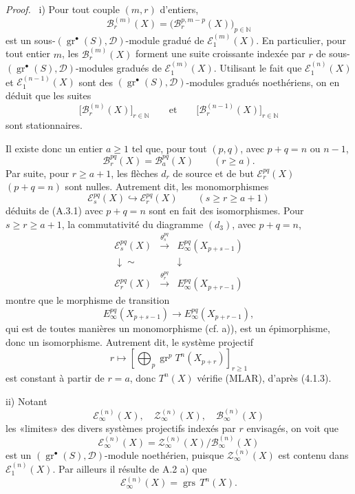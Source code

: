 \documentclass[11pt]{article}
\newenvironment{prooftext}[1][Proof]{\par\noindent\emph{#1.}\ }{\par\medskip}
\providecommand{\gr}{\operatorname{gr}}
\providecommand{\gr}{\operatorname{gr}}
\providecommand{\gr}{\operatorname{gr}}
\providecommand{\grs}{\operatorname{grs}}
\begin{document}
\begin{prooftext}
i) Pour tout couple \((m,r)\) d'entiers,
\[
\mathcal B_r^{(m)}(X)=\bigl(\mathcal B_r^{p,m-p}(X)\bigr)_{p\in\mathbb N}
\]
est un sous-\((\gr^\bullet(S),\mathcal D)\)-module gradué de \(\mathcal E_1^{(m)}(X)\). En particulier, pour tout entier \(m\), les \(\mathcal B_r^{(m)}(X)\) forment une suite croissante indexée par \(r\) de sous-\((\gr^\bullet(S),\mathcal D)\)-modules gradués de \(\mathcal E_1^{(m)}(X)\). Utilisant le fait que \(\mathcal E_1^{(n)}(X)\) et \(\mathcal E_1^{(n-1)}(X)\) sont des \((\gr^\bullet(S),\mathcal D)\)-modules gradués noethériens, on en déduit que les suites
\[
\bigl[\mathcal B_r^{(n)}(X)\bigr]_{r\in\mathbb N}
\qquad\text{et}\qquad
\bigl[\mathcal B_r^{(n-1)}(X)\bigr]_{r\in\mathbb N}
\]
sont stationnaires.

Il existe donc un entier \(a\ge1\) tel que, pour tout \((p,q)\), avec \(p+q=n\) ou \(n-1\),
\begin{equation}
\mathcal B_r^{pq}(X)=\mathcal B_a^{pq}(X)\qquad(r\ge a).
\tag{A.3.1}
\end{equation}
Par suite, pour \(r\ge a+1\), les flèches \(d_r\) de source et de but \(\mathcal E_r^{pq}(X)\) \((p+q=n)\) sont nulles. Autrement dit, les monomorphismes
\[
\mathcal E_s^{pq}(X)\hookrightarrow\mathcal E_r^{pq}(X)\qquad(s\ge r\ge a+1)
\]
déduits de (A.3.1) avec \(p+q=n\) sont en fait des isomorphismes. Pour \(s\ge r\ge a+1\), la commutativité du diagramme \((d_3)\), avec \(p+q=n\),
\[
\begin{array}{ccc}
\mathcal E_s^{pq}(X)&\xrightarrow{\theta_s^{pq}}&E_\infty^{pq}(X_{p+s-1})\\
\downarrow\sim&&\downarrow\\
\mathcal E_r^{pq}(X)&\xrightarrow{\theta_r^{pq}}&E_\infty^{pq}(X_{p+r-1})
\end{array}
\]
montre que le morphisme de transition
\[
E_\infty^{pq}(X_{p+s-1})\longrightarrow E_\infty^{pq}(X_{p+r-1}),
\]
qui est de toutes manières un monomorphisme (cf. a)), est un épimorphisme, donc un isomorphisme. Autrement dit, le système projectif
\[
r\longmapsto\left[\bigoplus_p\gr^p T^n(X_{p+r})\right]_{r\ge1}
\]
est constant à partir de \(r=a\), donc \(T^n(X)\) vérifie (MLAR), d'après (4.1.3).

ii) Notant
\[
\mathcal E_\infty^{(n)}(X),\quad
\mathcal Z_\infty^{(n)}(X),\quad
\mathcal B_\infty^{(n)}(X)
\]
les «limites» des divers systèmes projectifs indexés par \(r\) envisagés, on voit que
\[
\mathcal E_\infty^{(n)}(X)=
\mathcal Z_\infty^{(n)}(X)/\mathcal B_\infty^{(n)}(X)
\]
est un \((\gr^\bullet(S),\mathcal D)\)-module noethérien, puisque \(\mathcal Z_\infty^{(n)}(X)\) est contenu dans \(\mathcal E_1^{(n)}(X)\). Par ailleurs il résulte de A.2 a) que
\[
\mathcal E_\infty^{(n)}(X)=\grs\,T^n(X).
\]
\end{prooftext}
\end{document}
